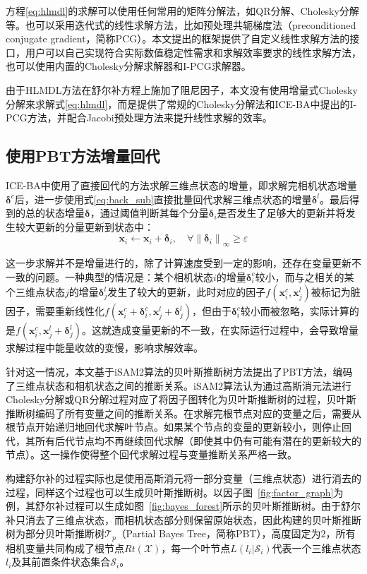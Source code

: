 方程\eqref{eq:hlmdl}的求解可以使用任何常用的矩阵分解法，如QR分解、Cholesky分解等。也可以采用迭代式的线性求解方法，比如预处理共轭梯度法（preconditioned conjugate gradient，简称PCG）。本文提出的框架提供了自定义线性求解方法的接口，用户可以自己实现符合实际数值稳定性需求和求解效率要求的线性求解方法，也可以使用内置的Cholesky分解求解器和I-PCG求解器。

由于HLMDL方法在舒尔补方程上施加了阻尼因子，本文没有使用增量式Cholesky分解\citep{polok2013incremental}来求解式\eqref{eq:hlmdl}，而是提供了常规的Cholesky分解法和ICE-BA中提出的I-PCG方法，并配合Jacobi预处理方法\citep{jeong2012pushing}来提升线性求解的效率。

\subsection{使用PBT方法增量回代}

ICE-BA中使用了直接回代的方法求解三维点状态的增量，即求解完相机状态增量$\bm{\delta}^c$后，进一步使用式\eqref{eq:back_sub}直接批量回代求解三维点状态的增量$\bm{\delta}^l$。最后得到的总的状态增量$\bm{\delta}$，通过阈值判断其每个分量$\bm{\delta}_i$是否发生了足够大的更新并将发生较大更新的分量更新到状态中：
\begin{equation}
    \bm{x}_i \leftarrow \bm{x}_i + \bm{\delta}_i, \quad
    \forall \left\|\bm{\delta}_i\right\|_{\infty} \geq \varepsilon
\end{equation}

这一步求解并不是增量进行的，除了计算速度受到一定的影响，还存在变量更新不一致的问题。一种典型的情况是：某个相机状态$i$的增量$\bm{\delta}^c_i$较小，而与之相关的某个三维点状态$j$的增量$\bm{\delta}^l_{j}$发生了较大的更新，此时对应的因子$f(\bm{x}^c_i,\bm{x}^l_j)$被标记为脏因子，需要重新线性化$f(\bm{x}^c_i+\bm{\delta}^c_i,\bm{x}^l_j+\bm{\delta}^l_j)$，但由于$\bm{\delta}^c_i$较小而被忽略，实际计算的是$f(\bm{x}^c_i,\bm{x}^l_j+\bm{\delta}^l_j)$。这就造成变量更新的不一致，在实际运行过程中，会导致增量求解过程中能量收敛的变慢，影响求解效率。

针对这一情况，本文基于iSAM2算法的贝叶斯推断树方法提出了PBT方法，编码了三维点状态和相机状态之间的推断关系。iSAM2算法认为通过高斯消元法进行Cholesky分解或QR分解过程对应了将因子图转化为贝叶斯推断树的过程，贝叶斯推断树编码了所有变量之间的推断关系。在求解完根节点对应的变量之后，需要从根节点开始递归地回代求解叶节点。如果某个节点的变量的更新较小，则停止回代，其所有后代节点均不再继续回代求解（即使其中仍有可能有潜在的更新较大的节点）。这一操作使得整个回代求解过程与变量推断关系严格一致。

构建舒尔补的过程实际也是使用高斯消元将一部分变量（三维点状态）进行消去的过程，同样这个过程也可以生成贝叶斯推断树。以因子图~\ref{fig:factor_graph}为例，其舒尔补过程可以生成如图~\ref{fig:bayes_forest}所示的贝叶斯推断树。由于舒尔补只消去了三维点状态，而相机状态部分则保留原始状态，因此构建的贝叶斯推断树为部分贝叶斯推断树$\mathcal{T}_p$（Partial Bayes Tree，简称PBT），高度固定为$2$，所有相机变量共同构成了根节点$Rt(\mathcal{X})$，每一个叶节点$L(l_i|\mathcal{S}_i)$代表一个三维点状态$l_i$及其前置条件状态集合$\mathcal{S}_i$。

